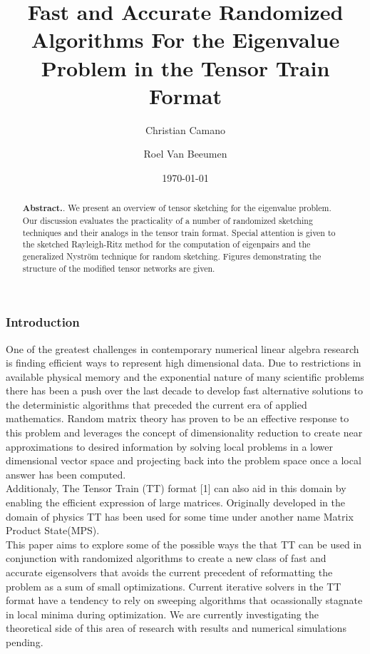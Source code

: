 \documentclass[%
 aip,12pt
 amsmath,amssymb,
 reprint,%
]{revtex4-1}
\begin{document}

\title[Fast and Accurate Randomized Algorithms For the Eigenvalue Problem in the Tensor Train Format]{Fast and Accurate Randomized Algorithms For the Eigenvalue Problem in the Tensor Train Format
}
\author{Christian Camano}
\author{Roel Van Beeumen}%
\date{\today}%

\begin{abstract}
\textbf{Abstract.}.
We present an overview of tensor sketching for the eigenvalue problem. Our discussion evaluates the practicality of a number of randomized sketching techniques and their analogs in the tensor train format. Special attention is given to the sketched Rayleigh-Ritz method for the computation of eigenpairs and the generalized Nyström technique for random sketching. Figures demonstrating the structure of the modified tensor networks are given.
\end{abstract}

\maketitle


\subsubsection{\label{sec:level3}Introduction}
One of the greatest challenges in contemporary numerical linear algebra research is finding efficient ways to represent high dimensional data. Due to restrictions in available physical memory and the exponential nature of many scientific problems there has been a push over the last decade to develop fast alternative solutions to the deterministic algorithms that preceded the current era of applied mathematics. Random matrix theory has proven to be an effective response to this problem and leverages the concept of dimensionality reduction to create near approximations to desired information by solving local problems in a lower dimensional vector space and projecting back into the problem space once a local answer has been computed.
\\
Additionaly, The Tensor Train (TT) format [1] can also aid in this domain by enabling the efficient expression of large matrices. Originally developed in the domain of physics TT has been used for some time under another name Matrix Product State(MPS).
\\
This paper aims to explore some of the possible ways the that TT can be used in conjunction with randomized algorithms to create a new class of fast and accurate eigensolvers that avoids the current precedent of reformatting the problem as a sum of small optimizations. Current iterative solvers in the TT format have a tendency to rely on sweeping algorithms that ocassionally stagnate in local minima during optimization. We are currently investigating the theoretical side of this area of research with results and numerical simulations pending.
\end{document}
